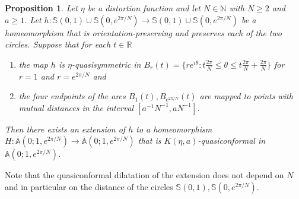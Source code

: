 \documentclass[letterpaper]{amsart}
\theoremstyle{plain}
\newtheorem{proposition}[theorem]{Proposition}
\theoremstyle{definition}
\theoremstyle{remark}
\numberwithin{equation}{section}
\numberwithin{theorem}{section}
\renewcommand{\bar}{\overline}
\newcommand{\R}{\mathbb R}
\newcommand{\N}{\mathbb N}
\begin{document}
\begin{proposition}\label{theorem:extension_annulus}
Let $\eta$ be a distortion function and let $N\in \N$ with $N\geq 2$ and $a\geq 1$. Let $h\colon  \mathbb S(0,1)\cup \mathbb S(0,e^{2\pi/N}) \to \mathbb S(0,1)\cup \mathbb S(0,e^{2\pi/N}) $ be a homeomorphism that is orientation-pre\-serving and preserves each of the two circles. Suppose that for each $t\in \R$
\begin{enumerate}[label=\normalfont(\arabic*)]
\item the map $h$ is $\eta$-quasisymmetric in $B_r(t)=\{re^{i\theta}: t \frac{2\pi}{N}\leq \theta\leq t\frac{2\pi}{N}+ \frac{2\pi}{N}\}$ for $r=1$ and $r=e^{2\pi/N}$ and
\item the four endpoints of the arcs $B_1(t), B_{e^{2\pi/N}}(t)$ are mapped to points with mutual distances in the interval $[a^{-1} N^{-1},a N^{-1}]$. 
\end{enumerate}
Then there exists an extension of $h$ to a homeomorphism $H\colon \bar{\mathbb A}(0;1,e^{2\pi/N})\to \bar{\mathbb A}(0;1,e^{2\pi/N})$ that is $K(\eta,a)$-quasiconformal in ${\mathbb A}(0;1,e^{2\pi/N})$.
\end{proposition}

Note that the quasiconformal dilatation of the extension does not depend on $N$ and in particular on the distance of the circles $\mathbb S(0,1),\mathbb S(0,e^{2\pi/N})$. 
\end{document}
